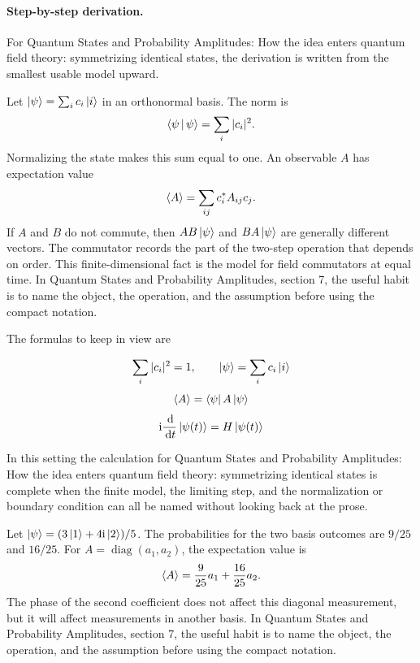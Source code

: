 \paragraph{Step-by-step derivation.}

For Quantum States and Probability Amplitudes: How the idea enters quantum field theory: symmetrizing identical states, the derivation is written from the smallest usable model upward.

Let \(\left|\psi\right\rangle=\sum_i c_i\left|i\right\rangle\) in an orthonormal basis.  The norm is
\[
  \left\langle \psi\,\middle|\,\psi\right\rangle=\sum_i |c_i|^2.
\]
Normalizing the state makes this sum equal to one.  An observable \(A\) has expectation value
\[
  \left\langle A\right\rangle=\sum_{ij}c_i^*A_{ij}c_j.
\]
If \(A\) and \(B\) do not commute, then \(AB\left|\psi\right\rangle\) and \(BA\left|\psi\right\rangle\) are generally different vectors.  The commutator records the part of the two-step operation that depends on order.  This finite-dimensional fact is the model for field commutators at equal time.  In Quantum States and Probability Amplitudes, section 7, the useful habit is to name the object, the operation, and the assumption before using the compact notation.

The formulas to keep in view are

\[
  \sum_i |c_i|^2=1,\qquad \left|\psi\right\rangle=\sum_i c_i\left|i\right\rangle
\]
\[
  \left\langle A\right\rangle=\left\langle \psi\right|A\left|\psi\right\rangle
\]
\[
  \mathrm i\frac{\,\mathrm d}{\,\mathrm d t}\left|\psi(t)\right\rangle=H\left|\psi(t)\right\rangle
\]

In this setting the calculation for Quantum States and Probability Amplitudes: How the idea enters quantum field theory: symmetrizing identical states is complete when the finite model, the limiting step, and the normalization or boundary condition can all be named without looking back at the prose.




\begin{example}
Let \(\left|\psi\right\rangle=(3\left|1\right\rangle+4\mathrm i\left|2\right\rangle)/5\).  The probabilities for the two basis outcomes are \(9/25\) and \(16/25\).  For \(A=\operatorname{diag}(a_1,a_2)\), the expectation value is
\[
  \left\langle A\right\rangle=\frac{9}{25}a_1+\frac{16}{25}a_2.
\]
The phase of the second coefficient does not affect this diagonal measurement, but it will affect measurements in another basis.  In Quantum States and Probability Amplitudes, section 7, the useful habit is to name the object, the operation, and the assumption before using the compact notation.
\end{example}



